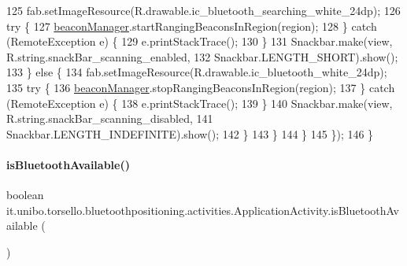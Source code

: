 \begin{DoxyCode}
125                         fab.setImageResource(R.drawable.ic\_bluetooth\_searching\_white\_24dp);
126                         \textcolor{keywordflow}{try} \{
127                             \hyperlink{classit_1_1unibo_1_1torsello_1_1bluetoothpositioning_1_1activities_1_1ApplicationActivity_a973c37226a3dbba6016966c3555aff65_a973c37226a3dbba6016966c3555aff65}{beaconManager}.startRangingBeaconsInRegion(region);
128                         \} \textcolor{keywordflow}{catch} (RemoteException e) \{
129                             e.printStackTrace();
130                         \}
131                         Snackbar.make(view, R.string.snackBar\_scanning\_enabled,
132                                 Snackbar.LENGTH\_SHORT).show();
133                     \} \textcolor{keywordflow}{else} \{
134                         fab.setImageResource(R.drawable.ic\_bluetooth\_white\_24dp);
135                         \textcolor{keywordflow}{try} \{
136                             \hyperlink{classit_1_1unibo_1_1torsello_1_1bluetoothpositioning_1_1activities_1_1ApplicationActivity_a973c37226a3dbba6016966c3555aff65_a973c37226a3dbba6016966c3555aff65}{beaconManager}.stopRangingBeaconsInRegion(region);
137                         \} \textcolor{keywordflow}{catch} (RemoteException e) \{
138                             e.printStackTrace();
139                         \}
140                         Snackbar.make(view, R.string.snackBar\_scanning\_disabled,
141                                 Snackbar.LENGTH\_INDEFINITE).show();
142                     \}
143                 \}
144             \}
145         \});
146     \}
\end{DoxyCode}
\hypertarget{classit_1_1unibo_1_1torsello_1_1bluetoothpositioning_1_1activities_1_1ApplicationActivity_abffd55741be864ad5b151c8f8c6d70ff_abffd55741be864ad5b151c8f8c6d70ff}{}\label{classit_1_1unibo_1_1torsello_1_1bluetoothpositioning_1_1activities_1_1ApplicationActivity_abffd55741be864ad5b151c8f8c6d70ff_abffd55741be864ad5b151c8f8c6d70ff} 
\paragraph{\texorpdfstring{is\+Bluetooth\+Available()}{isBluetoothAvailable()}}
{\footnotesize\ttfamily boolean it.\+unibo.\+torsello.\+bluetoothpositioning.\+activities.\+Application\+Activity.\+is\+Bluetooth\+Available (\begin{DoxyParamCaption}{ }\end{DoxyParamCaption})\hspace{0.3cm}{\ttfamily [private]}}


